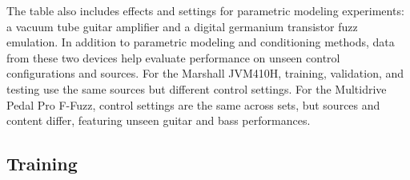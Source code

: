 The table also includes effects and settings for parametric modeling experiments: a vacuum tube guitar amplifier and a digital germanium transistor fuzz emulation.
In addition to parametric modeling and conditioning methods, data from these two devices help evaluate performance on unseen control configurations and sources. 
For the Marshall JVM410H, training, validation, and testing use the same sources but different control settings. 
For the Multidrive Pedal Pro F-Fuzz, control settings are the same across sets, but sources and content differ, featuring unseen guitar and bass performances.



\subsection{Training}
\label{sec:training}



